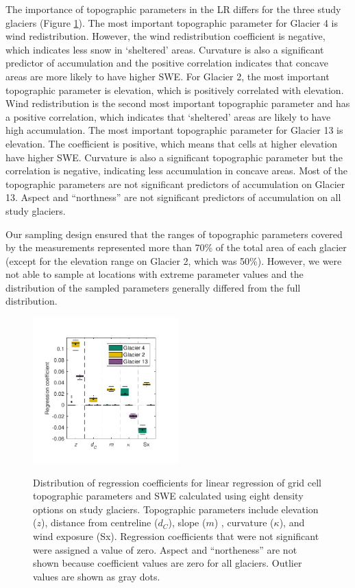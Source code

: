 \documentclass[twocolumn, letterpaper]{igs}
\begin{document}
The importance of topographic parameters in the LR differs for the three study glaciers (Figure \ref{fig:BetaCoeffs}). The most important topographic parameter for Glacier 4 is wind redistribution. However, the wind redistribution coefficient is negative, which indicates less snow in `sheltered' areas. Curvature is also a significant predictor of accumulation and the positive correlation indicates that concave areas are more likely to have higher SWE. For Glacier 2, the most important topographic parameter is elevation, which is positively correlated with elevation. Wind redistribution is the second most important topographic parameter and has a positive correlation, which indicates that `sheltered' areas are likely to have high accumulation. The most important topographic parameter for Glacier 13 is elevation. The coefficient is positive, which means that cells at higher elevation have higher SWE. Curvature is also a significant topographic parameter but the correlation is negative, indicating less accumulation in concave areas. Most of the topographic parameters are not significant predictors of accumulation on Glacier 13. Aspect and ``northness'' are not significant predictors of accumulation on all study glaciers.

Our sampling design ensured that the ranges of topographic parameters covered by the measurements represented more than 70\% of the total area of each glacier (except for the elevation range on Glacier 2, which was 50\%). However, we were not able to sample at locations with extreme parameter values and the distribution of the sampled parameters generally differed from the full distribution.


\begin{figure}
	\centering
	\includegraphics[width =0.5\textwidth]{BetaCoeffs.pdf}\\
	\caption{Distribution of regression coefficients for linear regression of grid cell topographic parameters and SWE calculated using eight density options on study glaciers. Topographic parameters include elevation ($z$), distance from centreline ($d_C$), slope ($m$) , curvature ($\kappa$), and wind exposure (Sx). Regression coefficients that were not significant were assigned a value of zero. Aspect and ``northeness'' are not shown because coefficient values are zero for all glaciers. Outlier values are shown as gray dots.}
	\label{fig:BetaCoeffs}
\end{figure}
\end{document}

